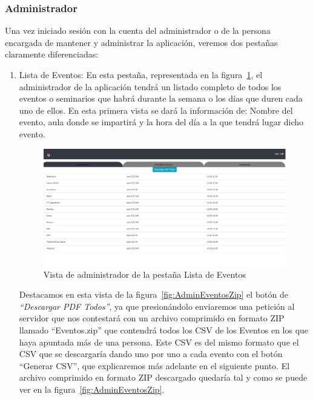 \documentclass[a4paper, 12pt]{book}
\begin{document}
\subsubsection{Administrador}
	Una vez iniciado sesión con la cuenta del administrador o de la persona encargada de mantener y administrar la aplicación, veremos dos pestañas claramente diferenciadas:
\begin{enumerate}	
	\item Lista de Eventos: En esta pestaña, representada en la figura~\ref{fig:adminListaEventos}, el administrador de la aplicación tendrá un listado completo de todos los eventos o seminarios que habrá durante la semana o los días que duren cada uno de ellos. En esta primera vista se dará la información de: Nombre del evento, aula donde se impartirá y la hora del día a la que tendrá lugar dicho evento.
	\begin{figure}[h!]
  	\centering
  	\includegraphics[width=16cm, keepaspectratio]{img/adminListaEventos.png}
  	\caption{Vista de administrador de la pestaña Lista de Eventos}\label{fig:adminListaEventos}
	\end{figure}
	
\vspace{6cm}


Destacamos en esta vista de la figura~\ref{fig:AdminEventosZip} el botón de \textit{``Descargar PDF Todos''}, ya que presionándolo enviaremos una petición al servidor que nos contestará con un archivo comprimido en formato ZIP llamado ``Eventos.zip'' que contendrá todos los CSV de los Eventos en los que haya apuntada más de una persona. Este CSV es del mismo formato que el CSV que se descargaría dando uno por uno a cada evento con el botón ``Generar CSV'', que explicaremos más adelante en el siguiente punto. El archivo comprimido en formato ZIP descargado quedaría tal y como se puede ver en la figura~\ref{fig:AdminEventosZip}.
	

\end{enumerate}
\end{document}
